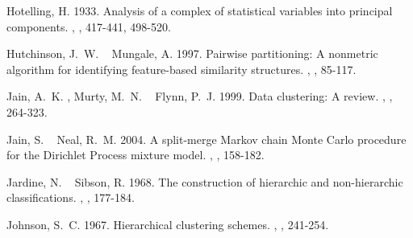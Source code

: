 \documentclass[11pt]{article}
\begin{document}
\begin{thebibliography}{}
%
%
Hotelling, H.%
%
\newblock{}\BBOP{}1933\BBCP{}.
\newblock{}\BBOQ{}Analysis of a complex of statistical variables into principal
  components.\BBCQ{}
\newblock{}, , 417-441, 498-520.

%
%
Hutchinson, J.~W.%
\BCBT{}\ \BBA{} Mungale, A.%
%
\newblock{}\BBOP{}1997\BBCP{}.
\newblock{}\BBOQ{}Pairwise partitioning: A nonmetric algorithm for identifying
  feature-based similarity structures.\BBCQ{}
\newblock{}, , 85-117.

%
%
Jain, A.~K.%
, Murty, M.~N.%
\BCBL{}\ \BBA{} Flynn, P.~J.%
%
\newblock{}\BBOP{}1999\BBCP{}.
\newblock{}\BBOQ{}Data clustering: A review.\BBCQ{}
\newblock{}, , 264-323.

%
%
Jain, S.%
\BCBT{}\ \BBA{} Neal, R.~M.%
%
\newblock{}\BBOP{}2004\BBCP{}.
\newblock{}\BBOQ{}A split-merge {M}arkov chain {M}onte {C}arlo procedure for
  the {D}irichlet {P}rocess mixture model.\BBCQ{}
\newblock{}, ,
  158-182.

%
%
Jardine, N.%
\BCBT{}\ \BBA{} Sibson, R.%
%
\newblock{}\BBOP{}1968\BBCP{}.
\newblock{}\BBOQ{}The construction of hierarchic and non-hierarchic
  classifications.\BBCQ{}
\newblock{}, , 177-184.

%
%
Johnson, S.~C.%
%
\newblock{}\BBOP{}1967\BBCP{}.
\newblock{}\BBOQ{}Hierarchical clustering schemes.\BBCQ{}
\newblock{}, , 241-254.


\end{thebibliography}
\end{document}
